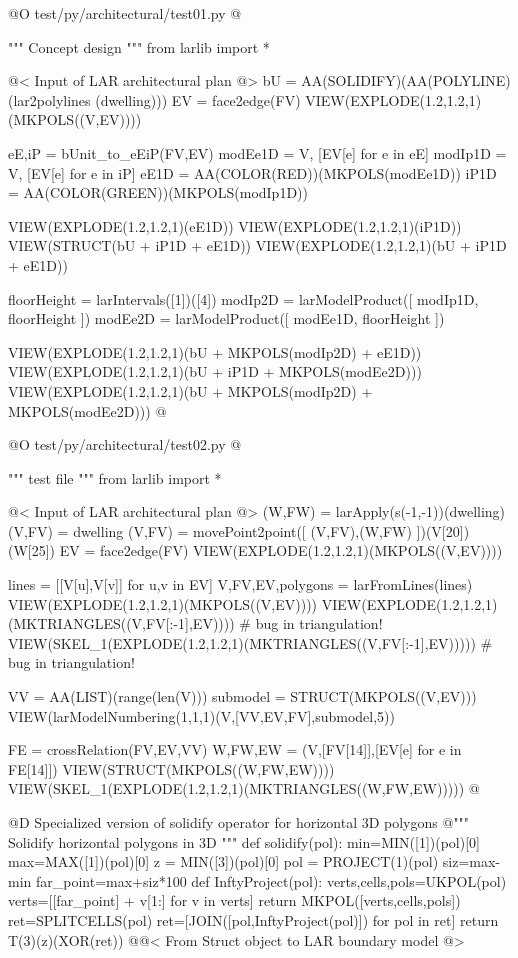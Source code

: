 \documentclass[11pt,oneside]{article}    %
\begin{document}
@O test/py/architectural/test01.py
@{""" Concept design """
from larlib import *

@< Input of LAR architectural plan @>
bU = AA(SOLIDIFY)(AA(POLYLINE)(lar2polylines (dwelling)))
EV = face2edge(FV)
VIEW(EXPLODE(1.2,1.2,1)(MKPOLS((V,EV))))

eE,iP = bUnit_to_eEiP(FV,EV)
modEe1D = V, [EV[e] for e in eE]
modIp1D = V, [EV[e] for e in iP]
eE1D = AA(COLOR(RED))(MKPOLS(modEe1D))
iP1D = AA(COLOR(GREEN))(MKPOLS(modIp1D))

VIEW(EXPLODE(1.2,1.2,1)(eE1D))
VIEW(EXPLODE(1.2,1.2,1)(iP1D))
VIEW(STRUCT(bU + iP1D + eE1D))
VIEW(EXPLODE(1.2,1.2,1)(bU + iP1D + eE1D))

floorHeight = larIntervals([1])([4])
modIp2D = larModelProduct([ modIp1D, floorHeight ])
modEe2D = larModelProduct([ modEe1D, floorHeight ])

VIEW(EXPLODE(1.2,1.2,1)(bU + MKPOLS(modIp2D) + eE1D))
VIEW(EXPLODE(1.2,1.2,1)(bU + iP1D + MKPOLS(modEe2D)))
VIEW(EXPLODE(1.2,1.2,1)(bU + MKPOLS(modIp2D) + MKPOLS(modEe2D)))
@}



@O test/py/architectural/test02.py
@{""" test file """
from larlib import *

@< Input of LAR architectural plan @>
(W,FW) = larApply(s(-1,-1))(dwelling)
(V,FV) = dwelling
(V,FV) = movePoint2point([ (V,FV),(W,FW) ])(V[20])(W[25])
EV = face2edge(FV)
VIEW(EXPLODE(1.2,1.2,1)(MKPOLS((V,EV))))

lines = [[V[u],V[v]] for u,v in EV]
V,FV,EV,polygons = larFromLines(lines)
VIEW(EXPLODE(1.2,1.2,1)(MKPOLS((V,EV))))
VIEW(EXPLODE(1.2,1.2,1)(MKTRIANGLES((V,FV[:-1],EV)))) # bug in triangulation!
VIEW(SKEL_1(EXPLODE(1.2,1.2,1)(MKTRIANGLES((V,FV[:-1],EV))))) # bug in triangulation!

VV = AA(LIST)(range(len(V)))
submodel = STRUCT(MKPOLS((V,EV)))
VIEW(larModelNumbering(1,1,1)(V,[VV,EV,FV],submodel,5))

FE = crossRelation(FV,EV,VV)
W,FW,EW = (V,[FV[14]],[EV[e] for e in FE[14]])
VIEW(STRUCT(MKPOLS((W,FW,EW))))
VIEW(SKEL_1(EXPLODE(1.2,1.2,1)(MKTRIANGLES((W,FW,EW)))))
@}



@D Specialized version of solidify operator for horizontal 3D polygons
@{""" Solidify horizontal polygons in 3D """
def solidify(pol):    
    min=MIN([1])(pol)[0]
    max=MAX([1])(pol)[0]
    z = MIN([3])(pol)[0]
    pol = PROJECT(1)(pol)
    siz=max-min
    far_point=max+siz*100 
    def InftyProject(pol):
        verts,cells,pols=UKPOL(pol)
        verts=[[far_point] + v[1:] for v in verts]
        return MKPOL([verts,cells,pols])  
    ret=SPLITCELLS(pol)
    ret=[JOIN([pol,InftyProject(pol)]) for pol in ret]
    return T(3)(z)(XOR(ret))
@}@< From Struct object to LAR boundary model @>
\end{document}

